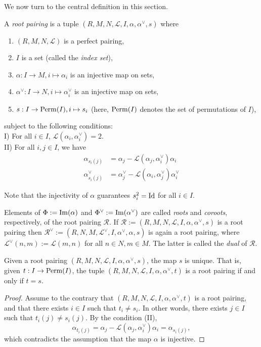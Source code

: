 We now turn to the central definition in this section.
\begin{definition}
    \label{def:root-pairing}
    \leanok
    A {\it root pairing} is a tuple $(R,M,N,\mathcal{L},I,\alpha, \alpha^\vee,s)$ where
       \begin{enumerate} 
        \item $(R,M,N,\mathcal{L})$ is a perfect pairing,
        \item  $I$ is a set (called the {\it index set}),
        \item $\alpha : I \to M, i \mapsto \alpha_i$ is an injective map on sets,
        \item $\alpha^\vee : I \to N, i \mapsto \alpha_i^\vee$ is an injective map on sets,
        \item $s : I \to {\rm Perm}(I), i \mapsto s_i$ (here, ${\rm Perm}(I)$ denotes the set of permutations of $I$),
       \end{enumerate}
       subject to the following conditions:\\
       I) For all $i \in I$, $\mathcal{L}(\alpha_i,\alpha^\vee_i) = 2$. \\
       II) For all $i,j \in I$, we have
            \begin{align*}
            \alpha_{s_i(j)} &= \alpha_j - \mathcal{L}(\alpha_j,\alpha^\vee_i)\alpha_i \\
            \alpha_{s_i(j)}^\vee &= \alpha_j^\vee - \mathcal{L}(\alpha_i,\alpha^\vee_j)\alpha_i^\vee
            \end{align*}
\end{definition}
Note that the injectivity of $\alpha$ guarantees $s_i^2 = {\rm Id}$ for all $i \in I$. 


Elements of $\Phi := {\rm Im}(\alpha)$ and $\Phi^\vee := {\rm Im}(\alpha^\vee)$ are called {\it roots} and {\it coroots}, 
respectively, of the root pairing $\mathcal{R}$. If $\mathcal{R} := (R,M,N,\mathcal{L},I,\alpha, \alpha^\vee,s)$ is 
a root pairing then $\mathcal{R}^\vee := (R,N,M,\mathcal{L}^\vee,I,\alpha^\vee, \alpha,s)$ is again 
a root pairing, where $\mathcal{L}^\vee (n,m) := \mathcal{L}(m,n)$ for all $n \in N,m \in M$. The 
latter is called the {\it dual} of $\mathcal{R}$. 

\begin{lemma}
    Given a root pairing $(R,M,N,\mathcal{L},I,\alpha, \alpha^\vee, s)$, the map $s$ is unique. 
    That is, given $t : I \to {\rm Perm}(I)$, the tuple $(R,M,N,\mathcal{L},I,\alpha, \alpha^\vee, t)$
    is a root pairing if and only if $t = s$.
\end{lemma}
\begin{proof}
    Assume to the contrary that $(R,M,N,\mathcal{L},I,\alpha, \alpha^\vee, t)$ is a root pairing, and that 
    there exists $i \in I$ such that $t_i \neq s_i$. In other words, there exists $j \in I$ such that
    $t_i(j) \neq s_i(j)$. By the condition (II),
    \[
        \alpha_{t_i(j)} = \alpha_j - \mathcal{L}(\alpha_j,\alpha^\vee_i)\alpha_i = \alpha_{s_i(j)},
    \]
    which contradicts the assumption that the map $\alpha$ is injective.
\end{proof}



